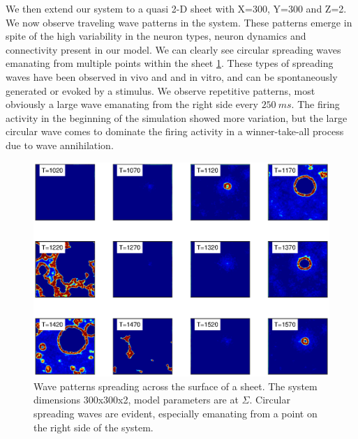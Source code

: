 \FloatBarrier

We then extend our system to a quasi 2-D sheet with X=300, Y=300 and Z=2.
We now observe traveling wave patterns in the system.
These patterns emerge in spite of the high variability in the neuron types, neuron dynamics and connectivity present in our model.
We can clearly see  circular spreading waves emanating from multiple points within the sheet \ref{fig:2D_waves}.
These types of spreading waves have been observed in vivo\citep{Mohajerani2013} and and in vitro, and can be spontaneously generated or evoked by a stimulus\citep{Stroh2013}.
We observe repetitive patterns, most obviously a large wave emanating from the right side every $250~ms$.
The firing activity in the beginning of the simulation showed more variation, but the large circular wave comes to dominate the firing activity 
in a winner-take-all process due to wave annihilation.
\begin{figure}[!htb]
 \caption{ Wave patterns spreading across the surface of a sheet. 
           The system dimensions 300x300x2, model parameters are at $\Sigma$. 
           Circular spreading waves are evident, especially emanating from a point on the right side of the system.}
 \label{fig:2D_waves}
 \centering
   \includegraphics[width=\textwidth]{fig/2DSpreadingWaves_Sigma}
\end{figure}

\FloatBarrier

